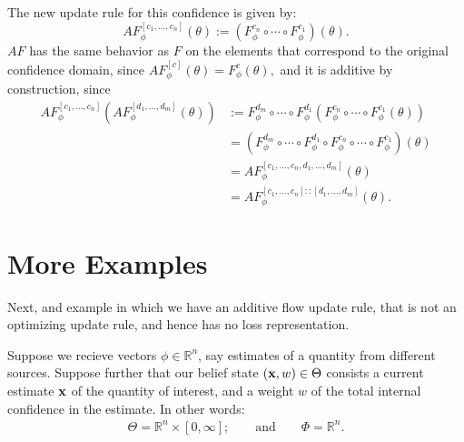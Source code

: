 \begin{subappendices}
\begin{lproof}
    The new update rule for this confidence is given by:
    	\[
    		AF^{[c_1, \ldots, c_n]}_\phi (\theta)  :=
    				(F^{c_n}_\phi \circ \cdots \circ F^{c_1}_\phi) (\theta).
    	\]
    $AF$ has the same behavior as $F$ on the elements that correspond to the original confidence domain, since
    $
    	AF^{[c]}_\phi(\theta) = F^c_\phi(\theta),
    $
    and it is additive by construction, since
    \begin{align*}
    AF^{[c_1, \ldots, c_n]}_\phi ( AF^{[d_1, \ldots, d_m]}_\phi (\theta) )
    		&:=
    			F^{d_m}_\phi \circ \cdots \circ F^{d_1}_\phi (
    			F^{c_n}_\phi \circ \cdots \circ F^{c_1}_\phi (\theta))\\
    		&= (F^{d_m}_\phi \circ \cdots \circ F^{d_1}_\phi \circ
    		F^{c_n}_\phi \circ \cdots \circ F^{c_1}_\phi) (\theta) \\
    		&= AF^{[c_1, \ldots, c_n, d_1, \ldots, d_m]}_\phi (\theta) \\
    		&= AF^{[c_1, \ldots, c_n] :: [d_1, \ldots, d_m]}_\phi (\theta).
    \end{align*}
    \end{lproof}%


    \section{More Examples}


    Next, and example in which we have an additive flow update rule,
    that is not an optimizing update rule, and hence has no loss representation.

    \begin{example}
        Suppose we recieve vectors $\phi \in \mathbb R^n$, 
        say estimates of a quantity from different sources.
        Suppose further that our belief state
        $(\mathbf x,w) \in \Theta$ consists a current estimate
        $\mathbf x$ of the quantity of interest, and a weight $w$ of the total internal confidence in the estimate.
        In other words:    
    	\begin{align*}
    		\Theta = \mathbb R^n \times [0,\infty];
    		\qquad
            \text{and}
            \qquad
    		\Phi = \mathbb R^n %
            .
    	\end{align*}


\end{example}
\end{subappendices}
